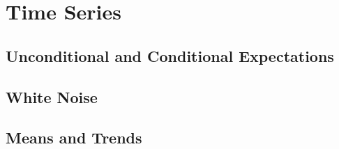 \chapter{Time Series}

\section{Unconditional and Conditional Expectations}

\section{White Noise}

\section{Means and Trends}